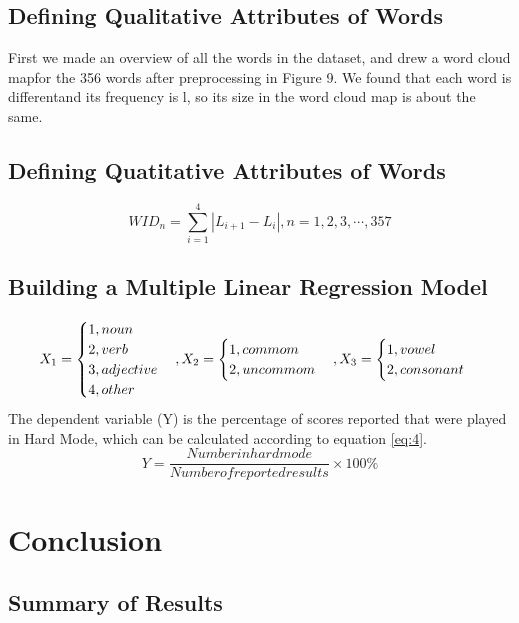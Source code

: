 \documentclass[12pt]{ctexart}
\begin{document}
\subsection{Defining Qualitative Attributes of Words}
First we made an overview of all the words in the dataset, and drew a word cloud mapfor the 356 words after preprocessing in Figure 9. We found that each word is differentand its frequency is l, so its size in the word cloud map is about the same.
\subsection{Defining Quatitative Attributes of Words}
\begin{equation}
	WID_n=\sum_{i=1}^{4}|L_{i+1}-L_i|, n=1,2,3,\cdots,357
\end{equation}

\subsection{Building a Multiple Linear Regression Model}

\begin{equation*}
	\centering
	X_1=\begin{cases}1, noun\\2, verb\\3, adjective\\4, other\end{cases}, X_2=\begin{cases}1, commom\\2, uncommom\end{cases}, X_3=\begin{cases}1, vowel\\2, consonant\end{cases}
\end{equation*}
The dependent variable (Y) is the percentage of scores reported that were played in Hard Mode, which can be calculated according to equation \eqref{eq:4}.
\begin{equation}
	Y=\frac{Number in hard mode}{Number of reported results}\times100\%
	\label{eq:4}
\end{equation}

\section{Conclusion}
\subsection{Summary of Results}
\end{document}

